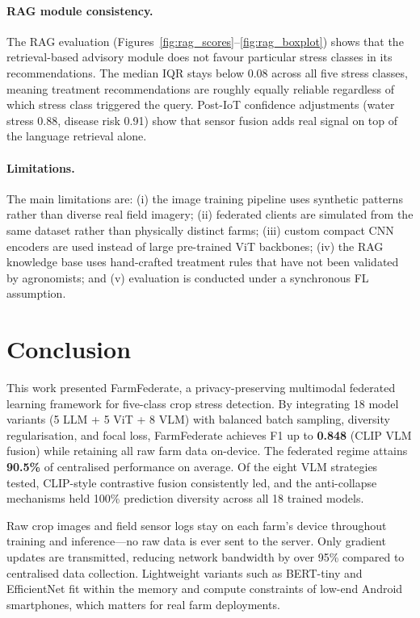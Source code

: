 \documentclass[12pt, a4paper, oneside]{Thesis}
\begin{document}
\paragraph{RAG module consistency.}
The RAG evaluation (Figures~\ref{fig:rag_scores}--\ref{fig:rag_boxplot}) shows that the retrieval-based advisory module does not favour particular stress classes in its recommendations. The median IQR stays below 0.08 across all five stress classes, meaning treatment recommendations are roughly equally reliable regardless of which stress class triggered the query. Post-IoT confidence adjustments (water stress 0.88, disease risk 0.91) show that sensor fusion adds real signal on top of the language retrieval alone.

\paragraph{Limitations.}
The main limitations are: (i) the image training pipeline uses synthetic patterns rather than diverse real field imagery; (ii) federated clients are simulated from the same dataset rather than physically distinct farms; (iii) custom compact CNN encoders are used instead of large pre-trained ViT backbones; (iv) the RAG knowledge base uses hand-crafted treatment rules that have not been validated by agronomists; and (v) evaluation is conducted under a synchronous FL assumption.

\section{Conclusion}

This work presented FarmFederate, a privacy-preserving multimodal federated learning framework for five-class crop stress detection. By integrating 18 model variants (5 LLM + 5 ViT + 8 VLM) with balanced batch sampling, diversity regularisation, and focal loss, FarmFederate achieves F1 up to \textbf{0.848} (CLIP VLM fusion) while retaining all raw farm data on-device. The federated regime attains \textbf{90.5\%} of centralised performance on average. Of the eight VLM strategies tested, CLIP-style contrastive fusion consistently led, and the anti-collapse mechanisms held 100\% prediction diversity across all 18 trained models.

Raw crop images and field sensor logs stay on each farm's device throughout training and inference---no raw data is ever sent to the server. Only gradient updates are transmitted, reducing network bandwidth by over 95\% compared to centralised data collection. Lightweight variants such as BERT-tiny and EfficientNet fit within the memory and compute constraints of low-end Android smartphones, which matters for real farm deployments.
\end{document}
